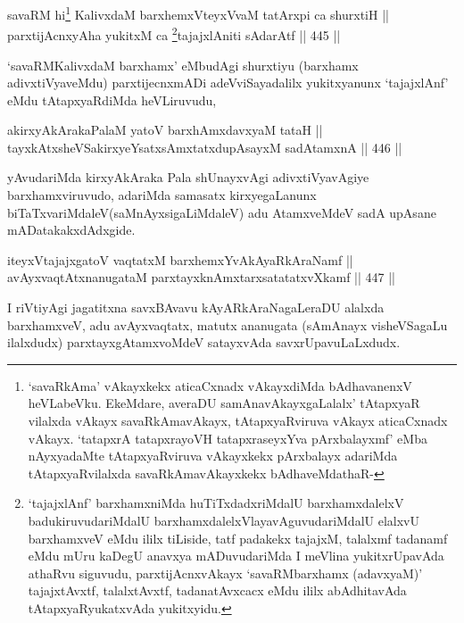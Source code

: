 \begin{shl}
savaRM hi\footnote{`savaRkAma' vAkayxkekx aticaCxnadx vAkayxdiMda bAdhavanenxV heVLabeVku. EkeMdare, averaDU samAnavAkayxgaLalalx' tAtapxyaR vilalxda vAkayx savaRkAmavAkayx, tAtapxyaRviruva vAkayx aticaCxnadx vAkayx. `tatapxrA tatapxrayoVH tatapxraseyxYva pArxbalayxmf' eMba nAyxyadaMte tAtapxyaRviruva vAkayxkekx pArxbalayx adariMda tAtapxyaRvilalxda savaRkAmavAkayxkekx bAdhaveMdathaR-} KalivxdaM barxhemxVteyxVvaM tatArxpi ca shurxtiH || \\
parxtijAcnxyA\s \s ha yukitxM ca \footnote{`tajajxlAnf' barxhamxniMda huTiTxdadxriMdalU barxhamxdalelxV badukiruvudariMdalU barxhamxdalelxV\break layavAguvudariMdalU elalxvU barxhamxveV eMdu ililx tiLiside, tatf padakekx tajajxM, talalxmf tadanamf eMdu mUru kaDegU anavxya mADuvudariMda I meVlina yukitxrUpavAda athaRvu siguvudu, parxtijAcnxvAkayx `savaRMbarxhamx (adavxyaM)' tajajxtAvxtf, talalxtAvxtf, tadanatAvxcacx eMdu ililx abAdhitavAda tAtapxyaRyukatxvAda yukitxyidu.}tajajxlAniti sAdarAtf \hfill || 445 ||  
\end{shl}


\begin{artha}
`savaRMKalivxdaM barxhamx' eMbudAgi shurxtiyu (barxhamx adivxtiVyaveMdu) parxtijecnxmADi adeVviSayadalilx yukitxyanunx `tajajxlAnf' eMdu tAtapxyaRdiMda heVLiruvudu,
\end{artha}


\begin{shl}
akirxyAkArakaPalaM yatoV barxhAmxdavxyaM tataH || \\
tayxkAtxsheVSakirxyeYsatxsAmxtatxdupAsayxM sadA\s \s tamxnA \hfill || 446 ||  
\end{shl}

\begin{artha}
yAvudariMda kirxyAkAraka Pala shUnayxvAgi adivxtiVyavAgiye barxhamxviruvudo, adariMda samasatx kirxyegaLanunx biTaTxvariMdaleV\break (saMnAyxsigaLiMdaleV) adu AtamxveMdeV sadA upAsane mADatakakxdAdxgide.
\end{artha}

\begin{shl}
iteyxVtajajxgatoV vaqtatxM barxhemxYvAkAyaRkAraNamf || \\
avAyxvaqtAtxnanugataM parxtayxknAmxtarxsatatatxvXkamf \hfill || 447 ||  
\end{shl}

\begin{artha}
I riVtiyAgi jagatitxna savxBAvavu kAyARkAraNagaLeraDU alalxda
barxhamxveV,  adu avAyxvaqtatx, matutx ananugata (sAmAnayx
visheVSagaLu ilalxdudx) parxtayxgAtamxvoMdeV satayxvAda
savxrUpavuLaLxdudx.
\end{artha}

